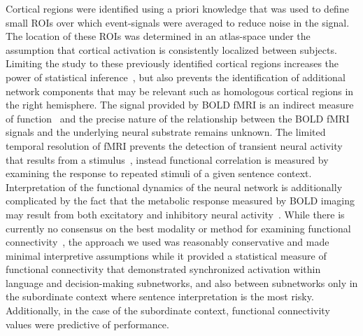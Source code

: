\documentclass[final,authoryear,5p,times,twocolumn]{elsarticle}
\begin{document}
Cortical regions were identified using a priori knowledge that was used to define small ROIs over which event-signals were averaged to reduce noise in the signal. The location of these ROIs was determined in an atlas-space under the assumption that cortical activation is consistently localized between subjects. Limiting the study to these previously identified cortical regions increases the power of statistical inference~\cite{Rykhlevskaia2008}, but also prevents the identification of additional network components that may be relevant such as homologous cortical regions in the right hemisphere. The signal provided by BOLD fMRI is an indirect measure of function~\cite{Ogawa1990} and the precise nature of the relationship between the BOLD fMRI signals and the underlying neural substrate remains unknown. The limited temporal resolution of fMRI prevents the detection of transient neural activity that results from a stimulus~\cite{Li2009}, instead functional correlation is measured by examining the response to repeated stimuli of a given sentence context. Interpretation of the functional dynamics of the neural network is additionally complicated by the fact that the metabolic response measured by BOLD imaging may result from both excitatory and inhibitory neural activity~\cite{Logothetis2003}.  While there is currently no consensus on the best modality or method for examining functional connectivity~\cite{Horwitz2003}, the approach we used was reasonably conservative and made minimal interpretive assumptions while it provided a statistical measure of functional connectivity that demonstrated synchronized activation within language and decision-making subnetworks, and also between subnetworks only in the subordinate context where sentence interpretation is the most risky. Additionally, in the case of the subordinate context, functional connectivity values were predictive of performance.
\end{document}

